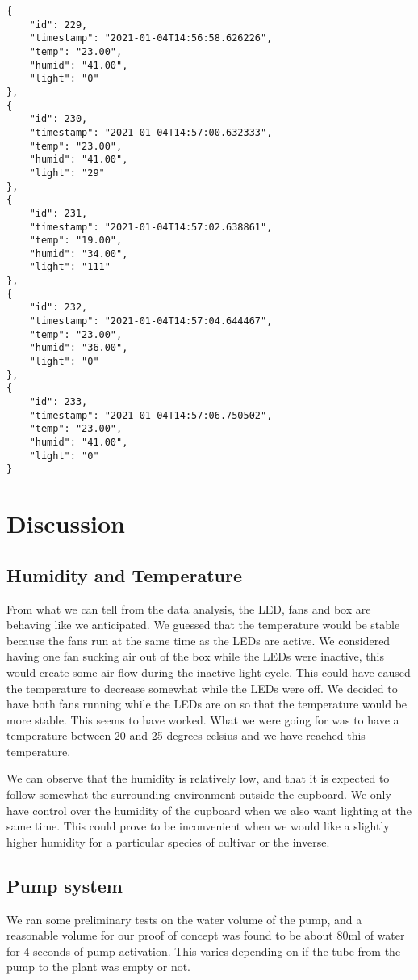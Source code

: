 \documentclass[12pt,a4paper,oneside]{book}
\begin{document}
\begin{verbatim}
{
    "id": 229,
    "timestamp": "2021-01-04T14:56:58.626226",
    "temp": "23.00",
    "humid": "41.00",
    "light": "0"
},
{
    "id": 230,
    "timestamp": "2021-01-04T14:57:00.632333",
    "temp": "23.00",
    "humid": "41.00",
    "light": "29"
},
{
    "id": 231,
    "timestamp": "2021-01-04T14:57:02.638861",
    "temp": "19.00",
    "humid": "34.00",
    "light": "111"
},
{
    "id": 232,
    "timestamp": "2021-01-04T14:57:04.644467",
    "temp": "23.00",
    "humid": "36.00",
    "light": "0"
},
{
    "id": 233,
    "timestamp": "2021-01-04T14:57:06.750502",
    "temp": "23.00",
    "humid": "41.00",
    "light": "0"
}
\end{verbatim}


\chapter{Discussion}

\section{Humidity and Temperature}
From what we can tell from the data analysis, the LED, fans and box are behaving like we anticipated. We guessed that the temperature would be stable because the fans run at the same time as the LEDs are active. We considered having one fan sucking air out of the box while the LEDs were inactive, this would create some air flow during the inactive light cycle. This could have caused the temperature to decrease somewhat while the LEDs were off. We decided to have both fans running while the LEDs are on so that the temperature would be more stable. This seems to have worked. What we were going for was to have a temperature between 20 and 25 degrees celsius and we have reached this temperature.

We can observe that the humidity is relatively low, and that it is expected to follow somewhat the surrounding environment outside the cupboard.
We only have control over the humidity of the cupboard when we also want lighting at the same time. This could prove to be inconvenient when we would like a slightly higher humidity for a particular species of cultivar or the inverse.

\section{Pump system}
We ran some preliminary tests on the water volume of the pump, and a reasonable volume for our proof of concept was found to be about 80ml of water for 4 seconds of pump activation. This varies depending on if the tube from the pump to the plant was empty or not.
\end{document}
